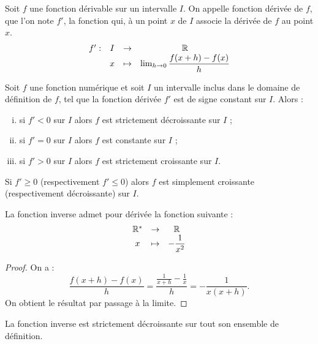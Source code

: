\documentclass[a4paper, 12pt]{report}
\begin{document}
\begin{rapl}
Soit $f$ une fonction dérivable sur un intervalle $I$. On appelle fonction dérivée de $f$, que l'on note $f'$, la fonction qui,
à un point $x$ de $I$ associe la dérivée de $f$ au point $x$.
\[ \begin{array}{c c c c}
f' : & I & \to & \mathbb{R} \\
& x & \mapsto & \lim_{h \to 0} \dfrac{f(x+h)-f(x)}{h} 
\end{array} \]
\end{rapl}

\begin{prop}
Soit $f$ une fonction numérique et soit $I$ un intervalle inclus dans le domaine de définition de $f$, 
tel que la fonction dérivée $f'$ est de signe constant sur $I$. Alors :
\begin{enumerate}[(i)]
\item si $f' < 0$ sur $I$ alors $f$ est strictement décroissante sur $I$ ;
\item si $f'=0$ sur $I$ alors $f$ est constante sur $I$ ;
\item si $f' > 0$ sur $I$ alors $f$ est strictement croissante sur $I$.
\end{enumerate}
\end{prop}

\begin{rmq}
Si $f' \geq 0$ (respectivement $f' \leq 0$) alors $f$ est simplement croissante (respectivement décroissante) sur $I$.
\end{rmq}

\begin{prop}
La fonction inverse admet pour dérivée la fonction suivante :
\[ \begin{array}{c c c}
\mathbb{R}^{\ast} & \to & \mathbb{R} \\
x & \mapsto & - \dfrac1{x^2}
\end{array} \] 
\end{prop}

\begin{proof}
On a :
\[ \dfrac{f(x+h)-f(x)}{h} = \dfrac{\frac{1}{x+h}-\frac1{x}}{h} = - \dfrac1{x(x+h)} . \]
On obtient le résultat par passage à la limite.
\end{proof}

\begin{coro}
La fonction inverse est strictement décroissante sur tout son ensemble de définition.
\end{coro}
\end{document}
